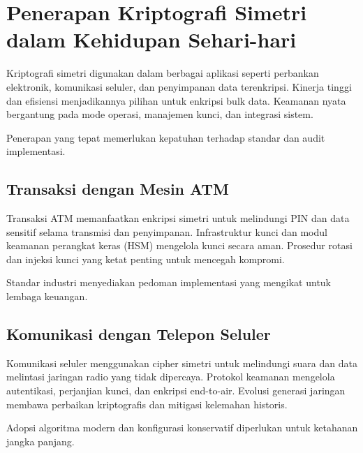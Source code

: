 \documentclass[../main.tex]{subfiles}
\begin{document}
\section{Penerapan Kriptografi Simetri dalam Kehidupan Sehari-hari}
Kriptografi simetri digunakan dalam berbagai aplikasi seperti perbankan elektronik, komunikasi seluler, dan penyimpanan data terenkripsi. Kinerja tinggi dan efisiensi menjadikannya pilihan untuk enkripsi bulk data. Keamanan nyata bergantung pada mode operasi, manajemen kunci, dan integrasi sistem.

Penerapan yang tepat memerlukan kepatuhan terhadap standar dan audit implementasi.

\subsection{Transaksi dengan Mesin ATM}
Transaksi ATM memanfaatkan enkripsi simetri untuk melindungi PIN dan data sensitif selama transmisi dan penyimpanan. Infrastruktur kunci dan modul keamanan perangkat keras (HSM) mengelola kunci secara aman. Prosedur rotasi dan injeksi kunci yang ketat penting untuk mencegah kompromi.

Standar industri menyediakan pedoman implementasi yang mengikat untuk lembaga keuangan.

\subsection{Komunikasi dengan Telepon Seluler}
Komunikasi seluler menggunakan cipher simetri untuk melindungi suara dan data melintasi jaringan radio yang tidak dipercaya. Protokol keamanan mengelola autentikasi, perjanjian kunci, dan enkripsi end-to-air. Evolusi generasi jaringan membawa perbaikan kriptografis dan mitigasi kelemahan historis.

Adopsi algoritma modern dan konfigurasi konservatif diperlukan untuk ketahanan jangka panjang.
\end{document}
